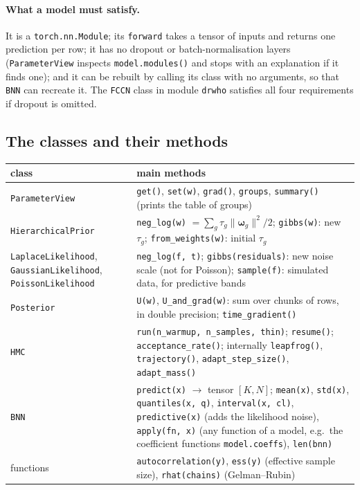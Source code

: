 \documentclass[11pt]{article}
\newcommand{\code}[1]{\texttt{#1}}
\newcommand{\bw}{\boldsymbol{\omega}}
\begin{document}
\paragraph{What a model must satisfy.} It is a \code{torch.nn.Module}; its
\code{forward} takes a tensor of inputs and returns one prediction per row; it has no
dropout or batch-normalisation layers (\code{ParameterView} inspects
\code{model.modules()} and stops with an explanation if it finds one); and it can be
rebuilt by calling its class with no arguments, so that \code{BNN} can recreate it. The 
\code{FCCN} class in module \code{drwho} satisfies all four
requirements if dropout is omitted.

\subsection{The classes and their methods}

\begin{center}
\small
\begin{tabular}{p{}p{}}
\toprule
class & main methods\\
\midrule
\code{ParameterView} & \code{get()}, \code{set(w)}, \code{grad()}, \code{groups},
  \code{summary()} (prints the table of groups)\\
\code{HierarchicalPrior} & \code{neg\_log(w)} $= \sum_g \tau_g\lVert\bw_g\rVert^2/2$;
  \code{gibbs(w)}: new $\tau_g$; \code{from\_weights(w)}: initial $\tau_g$\\
\code{LaplaceLikelihood}, \code{GaussianLikelihood}, \code{PoissonLikelihood} &
  \code{neg\_log(f, t)}; \code{gibbs(residuals)}: new noise scale (not for Poisson);
  \code{sample(f)}: simulated data, for predictive bands\\
\code{Posterior} & \code{U(w)}, \code{U\_and\_grad(w)}: sum over chunks of rows, in
  double precision; \code{time\_gradient()}\\
\code{HMC} & \code{run(n\_warmup, n\_samples, thin)}; \code{resume()};
  \code{acceptance\_rate()}; internally \code{leapfrog()}, \code{trajectory()},
  \code{adapt\_step\_size()}, \code{adapt\_mass()}\\
\code{BNN} & \code{predict(x)} $\to$ tensor $[K, N]$; \code{mean(x)}, \code{std(x)},
  \code{quantiles(x, q)}, \code{interval(x, cl)}, \code{predictive(x)} (adds the
  likelihood noise), \code{apply(fn, x)} (any function of a model, e.g.\ the
  coefficient functions \code{model.coeffs}), \code{len(bnn)}\\
functions & \code{autocorrelation(y)}, \code{ess(y)} (effective sample size),
  \code{rhat(chains)} (Gelman--Rubin)\\
\bottomrule
\end{tabular}
\end{center}
\end{document}
